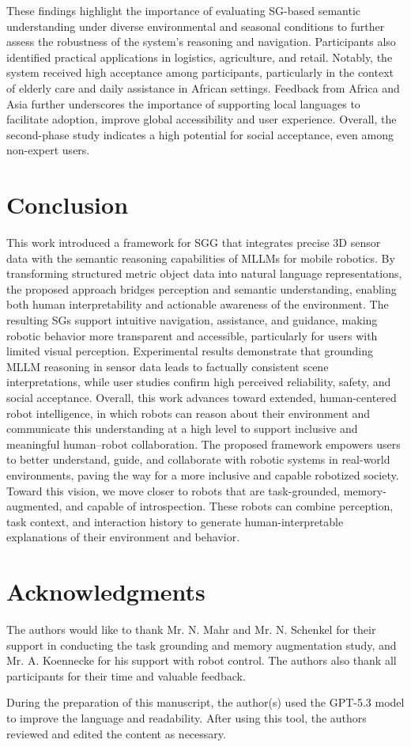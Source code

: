 \documentclass[lettersize,journal]{IEEEtran}
\begin{document}
These findings highlight the importance of evaluating SG-based semantic understanding under diverse environmental and seasonal conditions to further assess the robustness of the system’s reasoning and navigation. Participants also identified practical applications in logistics, agriculture, and retail. Notably, the system received high acceptance among  participants, particularly in the context of elderly care and daily assistance in African settings. Feedback from Africa and Asia further underscores the importance of supporting local languages to facilitate adoption, improve global accessibility and user experience. Overall, the second-phase study indicates a high potential for social acceptance, even among non-expert users.

\section{Conclusion}\label{conclusion}

This work introduced a framework for SGG that integrates precise 3D sensor data with the semantic reasoning capabilities of MLLMs for mobile robotics. By transforming structured metric object data into natural language representations, the proposed approach bridges perception and semantic understanding, enabling both human interpretability and actionable awareness of the environment. The resulting SGs support intuitive navigation, assistance, and guidance, making robotic behavior more transparent and accessible, particularly for users with limited visual perception. Experimental results demonstrate that grounding MLLM reasoning in sensor data leads to factually consistent scene interpretations, while user studies confirm high perceived reliability, safety, and social acceptance. Overall, this work advances toward extended, human-centered robot intelligence, in which robots can reason about their environment and communicate this understanding at a high level to support inclusive and meaningful human–robot collaboration. The proposed framework empowers users to better understand, guide, and collaborate with robotic systems in real-world environments, paving the way for a more inclusive and capable robotized society. Toward this vision, we move closer to robots that are task-grounded, memory-augmented, and capable of introspection. These robots can combine perception, task context, and interaction history to generate human-interpretable explanations of their environment and behavior.

\section*{Acknowledgments}
The authors would like to thank Mr. N. Mahr and Mr. N. Schenkel for their support in conducting the task grounding and memory augmentation study, and Mr. A. Koennecke for his support with robot control. The authors also thank all participants for their time and valuable feedback.

During the preparation of this manuscript, the author(s) used the GPT-5.3 model to improve the language and readability. After using this tool, the authors reviewed and edited the content as necessary. 









\vfill
\end{document}
